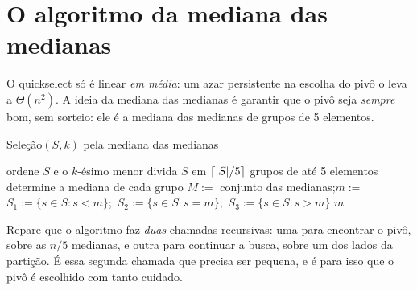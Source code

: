 \section{O algoritmo da mediana das medianas}\label{sec:mmedianas}
O quickselect só é linear \emph{em média}: um azar persistente na escolha do pivô o leva a $\Theta(n^2)$. A ideia da mediana das medianas é garantir que o pivô seja \emph{sempre} bom, sem sorteio: ele é a mediana das medianas de grupos de 5 elementos.
\begin{pseudo}{Seleção$(S,k)$ pela mediana das medianas}
\begin{algorithmic}
   \State ordene $S$ e \Return o $k$-ésimo menor \EndIf
  \State divida $S$ em $\lceil|S|/5\rceil$ grupos de até 5 elementos
  \State determine a mediana de cada grupo 
  \State $M:=$ conjunto das medianas;\quad $m:=$  
  \State $S_1:=\{s\in S: s<m\}$;\ $S_2:=\{s\in S: s=m\}$;\ $S_3:=\{s\in S: s>m\}$
   \State \Return {} 
   \State \Return $m$
  \Else \State \Return {}
  \EndIf
\EndFunction
\end{algorithmic}
\end{pseudo}
Repare que o algoritmo faz \emph{duas} chamadas recursivas: uma para encontrar o pivô, sobre as $n/5$ medianas, e outra para continuar a busca, sobre um dos lados da partição. É essa segunda chamada que precisa ser pequena, e é para isso que o pivô é escolhido com tanto cuidado.

